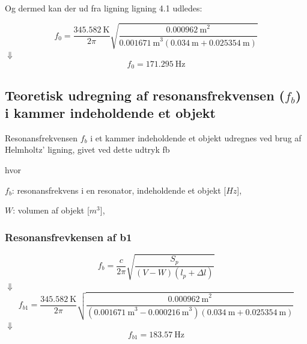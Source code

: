 {Og dermed kan der ud fra ligning ligning 4.1 udledes: 

\begin{equation}
		f_{0} = \frac{{\SI{345,582}{\kelvin}}}{2\pi}\sqrt{\frac{{\SI{0,000962}{\meter}^2}}{{\SI{0,001671}{\meter}^3}({\SI{0,034}{\meter}}+ {\SI{0.025354}{\meter}})}}
\end{equation}	
$\Downarrow$
\begin{equation}
		f_{0} = {\SI{171,295}{\hertz}}
		\end{equation}

\subsection{Teoretisk udregning af resonansfrekvensen ($f_{b}$) i kammer indeholdende et objekt}

Resonansfrekvensen $f_{b}$ i et kammer indeholdende et objekt udregnes ved brug af Helmholtz' ligning, givet ved dette udtryk fb

hvor 
\begin{description}[align=left,labelindent=0.3cm]
\item $f_{b}$: resonansfrekvens i en resonator, indeholdende et objekt [$Hz$],\\
\item $W$: volumen af objekt [$m^3$],\\
\end{description}


\subsubsection{Resonansfrevkensen af b1} 
\hspace{1,5cm}
\begin{equation}
		f_{b} = \frac{c}{2\pi}\sqrt{\frac{S_{p}}{(V-W)(l_{p}+\Delta l)}}
	\end{equation}
$\Downarrow$
\begin{equation}
		f_{b1} = \frac{{\SI{345,582}{\kelvin}}}{2\pi}\sqrt{\frac{{\SI{0,000962}{\meter}^2}}{({\SI{0,001671}{\meter}^3}-{\SI{0,000216}{\meter}^3})({\SI{0,034}{\meter}}+ {\SI{0.025354}{\meter}})}}	
\end{equation}
$\Downarrow$
\begin{equation}
		f_{b1} = {\SI{183,57}{\hertz}}
\end{equation}

}
